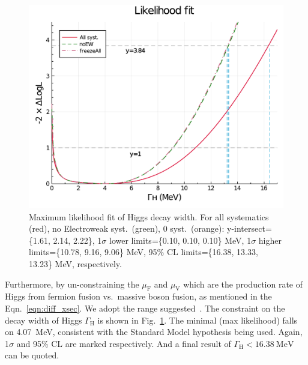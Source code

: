 \begin{figure}[h]
    \centering
    \includegraphics[width=.8\linewidth]{fig/Final_fit_width.pdf}
    \caption{Maximum likelihood fit of Higgs decay width. For all systematics (red), no Electroweak syst.~(green),
    0 syst.~(orange): y-intersect=\{1.61, 2.14, 2.22\}, 1$\sigma$ lower limits=\{0.10, 0.10, 0.10\} MeV,
1$\sigma$ higher limits=\{10.78, 9.16, 9.06\} MeV, 95\% CL limits=\{16.38, 13.33, 13.23\} MeV, respectively.}
\label{fig:final_fit_width}
\end{figure}
Furthermore, by un-constraining the $\mu_\mathrm{F}$ and $\mu_\mathrm{V}$ which are the production rate
of Higgs from fermion fusion vs.\ massive boson fusion, as mentioned in the Eqn.~\ref{eqn:diff_xsec}.
We adopt the range suggested~\cite{rfrv_higgs_pas}. The constraint on the decay width of Higgs $\Gamma_\mathrm{H}$ is shown in 
Fig.~\ref{fig:final_fit_width}. The minimal (max likelihood) falls on \SI{4.07}{\mega\electronvolt},
consistent with the Standard Model hypothesis being used. 
Again, 1$\sigma$ and 95\% CL are marked respectively. And a final result of 
$\Gamma_\mathrm{H}<\SI{16.38}{\mega\electronvolt}$ can be quoted.


